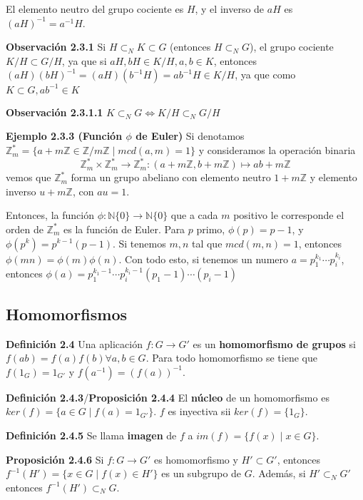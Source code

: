 \documentclass[a4paper, 11pt]{extarticle}
\newcommand{\propo}[1]{\textcolor{rojo}{\textbf{Proposición #1}}}
\newcommand{\defi}[1]{\textcolor{azul}{\textbf{Definición #1}}}
\newcommand{\obs}[1]{\textcolor{verde}{\textbf{Observación #1}}}
\newcommand{\ejem}[1]{\textcolor{verde}{\textbf{Ejemplo #1}}}
\begin{document}
El elemento neutro del grupo cociente es \(H\), y el inverso de \(aH\) es \((aH)^{-1} = a^{-1}H\).

\obs{2.3.1} Si \(H \subset_N K \subset G\) (entonces \(H \subset_N G\)), el
grupo cociente \(K/H \subset G/H\),  ya que si \(aH,bH \in K/H, a,b \in K\), entonces \((aH)(bH)^{-1} =
(aH)(b^{-1}H) = ab^{-1}H \in K/H\), ya que como \(K \subset G
, ab^{-1} \in K\)

\obs{2.3.1.1} \(K \subset_N G \iff K/H \subset_N G/H\)

\ejem{2.3.3 (Función \( \phi \) de Euler)} Si denotamos \(\mathbb{Z}^*_m = \{
a+m \mathbb{Z} \in \mathbb{Z} / m \mathbb{Z}
\;|\; mcd(a,m) = 1 \}\) y consideramos la operación binaria
\[ \mathbb{Z}^*_m \times \mathbb{Z}^*_m \rightarrow \mathbb{Z}^*_m: (a+m \mathbb{Z},
b+ m \mathbb{Z}) \mapsto ab + m \mathbb{Z}
\]
vemos que \(\mathbb{Z}^*_m\) forma un grupo abeliano con elemento neutro \(1 +
m \mathbb{Z}\) y elemento inverso \(u + m \mathbb{Z}\), con \(au = 1\).

Entonces, la función \(\phi: \mathbb{N}\{ 0 \} \rightarrow  \mathbb{N}\{ 0 \}\) que a cada \(m\) positivo le corresponde el orden de \(\mathbb{Z}^*_m\) es
la función de Euler. Para \(p\) primo, \(\phi(p) = p-1\), y \(\phi(p^k) = p^{k-1}(p-1)\). Si
tenemos \(m,n\) tal que \(mcd(m,n)=1\), entonces \(\phi(mn) =
\phi(m)\phi(n)\). Con todo esto, si tenemos un numero \(a = p_1^{k_1} \cdots
p_i^{k_i}\), entonces \(\phi(a) = p_1^{k_1-1} \cdots p_i^{k_i-1} (p_1-1) \cdots(p_i-1)\)

\subsection{Homomorfismos}
\label{sec:orgb8c6fe9}
   \defi{2.4} Una aplicación \(f:G \rightarrow G'\) es un \textbf{homomorfismo de grupos} si \(f(ab) = f(a)f(b) \forall a,b \in G\).
Para todo homomorfismo se tiene que \(f(1_G) = 1_{G'}\) y \(f(a^{-1}) =
(f(a))^{-1}\).

\defi{2.4.3}/\propo{2.4.4} El \textbf{núcleo} de un homomorfismo es \(ker(f) = \{ a \in G \;|\; f(a) =
1_{G'} \}\). \(f\) es inyectiva sii \(ker(f) = \{ 1_G \}\).

\defi{2.4.5} Se llama \textbf{imagen} de \(f\) a \(im(f) = \{ f(x) \;|\; x \in G \}\).

\propo{2.4.6} Si \(f: G \rightarrow G'\) es homomorfismo y \(H' \subset G'\), entonces \(f^{-1}(H') = \{ x \in G \;|\; f(x) \in H' \}\) es un subgrupo
de \(G\). Además, si \(H' \subset_N G'\) entonces \(f^{-1}(H') \subset_N G\).
\end{document}
